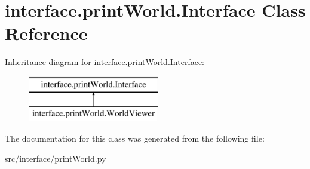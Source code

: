 \hypertarget{classinterface_1_1print_world_1_1_interface}{\section{interface.\-print\-World.\-Interface \-Class \-Reference}
\label{classinterface_1_1print_world_1_1_interface}
}
\-Inheritance diagram for interface.\-print\-World.\-Interface\-:\begin{figure}[H]
\begin{center}
\leavevmode
\includegraphics[height=2.000000cm]{classinterface_1_1print_world_1_1_interface}
\end{center}
\end{figure}


\-The documentation for this class was generated from the following file\-:\begin{DoxyCompactItemize}
\item 
src/interface/print\-World.\-py\end{DoxyCompactItemize}
